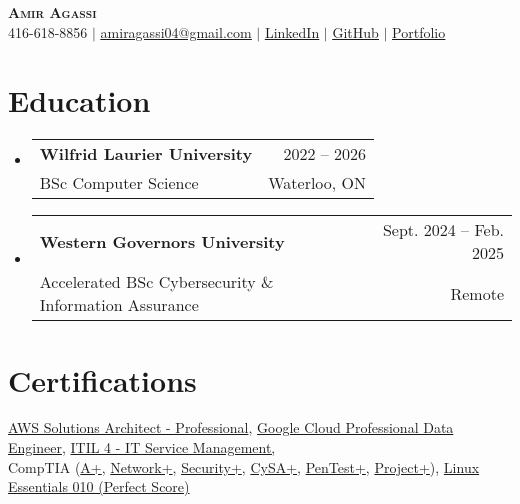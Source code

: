 \documentclass[letterpaper,11pt]{article}
\makeatletter
\newcommand{\resumeSubheading}[4]{
  \item
    \begin{tabular*}{0.97\textwidth}[t]{l@{\extracolsep{\fill}}r}
      \textbf{#1} & #2 \\
      \small#3 & \small#4
    \end{tabular*}\vspace{-5pt}
}
\newcommand{\resumeSubHeadingListStart}{\begin{itemize}[leftmargin=0.15in, label={}]}
\newcommand{\resumeSubHeadingListEnd}{\end{itemize}}
\makeatother
\begin{document}

\begin{center}
    \textbf{\Huge \scshape {Amir} {Agassi}} \\ \vspace{1pt}
    \small 416-618-8856 $|$ \href{mailto:amiragassi04@gmail.com}{\underline{amiragassi04@gmail.com}} $|$ 
    \href{https://www.linkedin.com/in/amir-agassi/}{\underline{LinkedIn}} $|$
    \href{https://github.com/amiragassi}{\underline{GitHub}} $|$
    \href{https://amiragassi.com}{\underline{Portfolio}}
\end{center}


\section{Education}
  \resumeSubHeadingListStart
    \resumeSubheading
      {Wilfrid Laurier University}{2022 -- 2026}
      {BSc Computer Science}{Waterloo, ON}
    \resumeSubheading
      {Western Governors University}{Sept. 2024 -- Feb. 2025}
      {Accelerated BSc Cybersecurity \& Information Assurance}{Remote}
  \resumeSubHeadingListEnd


\section{Certifications}
    \begin{itemize}[leftmargin=0.15in, label={}]
        \small{\item{
        \href{https://cp.certmetrics.com/amazon/en/public/verify/credential/2LC36B3CWM411J3K}{AWS Solutions Architect - Professional}, \href{https://www.credly.com/badges/c9811ec9-a04e-439f-a1bf-f4e18f11c6ee/public_url}{Google Cloud Professional Data Engineer}, \href{https://www.linkedin.com/in/amir-agassi/details/certifications/1736993044174/single-media-viewer/?profileId=ACoAAEZvsg8BHJ2SKQfF3qavwxRrYll5Acx8QSg}{ITIL 4 - IT Service Management,} \\
        CompTIA (\href{https://www.credly.com/badges/f474c77c-bbcf-4327-aa37-3dd99da3ba62/public_url}{A+}, \href{https://www.credly.com/badges/438afda8-6dca-4ad4-94db-0d44baf82fd6/public_url}{Network+}, \href{https://www.credly.com/badges/ddb1f2a4-4e5d-4f97-bc55-ff52a9ade614/public_url}{Security+}, \href{https://www.credly.com/earner/earned/badge/bfaf1b1c-51b4-4b34-b708-aa649e51a294}{CySA+}, \href{https://www.credly.com/earner/earned/badge/d592ba39-9b53-43a3-b502-a357987484a4}{PenTest+}, \href{https://www.credly.com/badges/eb621d7d-a8c0-4233-b246-907323b95429/public_url}{Project+}), \href{https://cs.lpi.org/caf/Xamman/certification/verify/LPI000645485/j6l5zdd7sf}{Linux Essentials 010 (Perfect Score)}
        }}
    \end{itemize}
\end{document}
